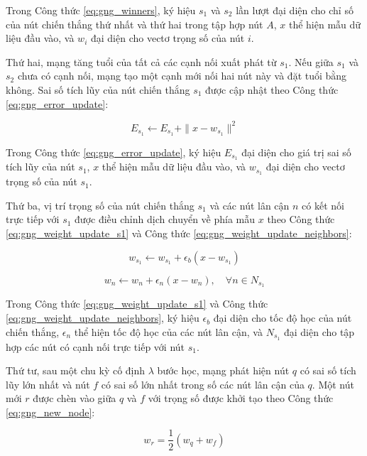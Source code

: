 Trong Công thức \ref{eq:gng_winners}, ký hiệu $s_1$ và $s_2$ lần lượt đại diện cho chỉ số của nút chiến thắng thứ nhất và thứ hai trong tập hợp nút $A$, $x$ thể hiện mẫu dữ liệu đầu vào, và $w_i$ đại diện cho vectơ trọng số của nút $i$.

Thứ hai, mạng tăng tuổi của tất cả các cạnh nối xuất phát từ $s_1$. Nếu giữa $s_1$ và $s_2$ chưa có cạnh nối, mạng tạo một cạnh mới nối hai nút này và đặt tuổi bằng không. Sai số tích lũy của nút chiến thắng $s_1$ được cập nhật theo Công thức \ref{eq:gng_error_update}:

\begin{equation}
E_{s_1} \leftarrow E_{s_1} + \|x - w_{s_1}\|^2
\label{eq:gng_error_update}
\end{equation}

Trong Công thức \ref{eq:gng_error_update}, ký hiệu $E_{s_1}$ đại diện cho giá trị sai số tích lũy của nút $s_1$, $x$ thể hiện mẫu dữ liệu đầu vào, và $w_{s_1}$ đại diện cho vectơ trọng số của nút $s_1$.

Thứ ba, vị trí trọng số của nút chiến thắng $s_1$ và các nút lân cận $n$ có kết nối trực tiếp với $s_1$ được điều chỉnh dịch chuyển về phía mẫu $x$ theo Công thức \ref{eq:gng_weight_update_s1} và Công thức \ref{eq:gng_weight_update_neighbors}:

\begin{equation}
w_{s_1} \leftarrow w_{s_1} + \epsilon_b (x - w_{s_1})
\label{eq:gng_weight_update_s1}
\end{equation}

\begin{equation}
w_n \leftarrow w_n + \epsilon_n (x - w_n), \quad \forall n \in N_{s_1}
\label{eq:gng_weight_update_neighbors}
\end{equation}

Trong Công thức \ref{eq:gng_weight_update_s1} và Công thức \ref{eq:gng_weight_update_neighbors}, ký hiệu $\epsilon_b$ đại diện cho tốc độ học của nút chiến thắng, $\epsilon_n$ thể hiện tốc độ học của các nút lân cận, và $N_{s_1}$ đại diện cho tập hợp các nút có cạnh nối trực tiếp với nút $s_1$.

Thứ tư, sau một chu kỳ cố định $\lambda$ bước học, mạng phát hiện nút $q$ có sai số tích lũy lớn nhất và nút $f$ có sai số lớn nhất trong số các nút lân cận của $q$. Một nút mới $r$ được chèn vào giữa $q$ và $f$ với trọng số được khởi tạo theo Công thức \ref{eq:gng_new_node}:

\begin{equation}
w_r = \frac{1}{2}(w_q + w_f)
\label{eq:gng_new_node}
\end{equation}

